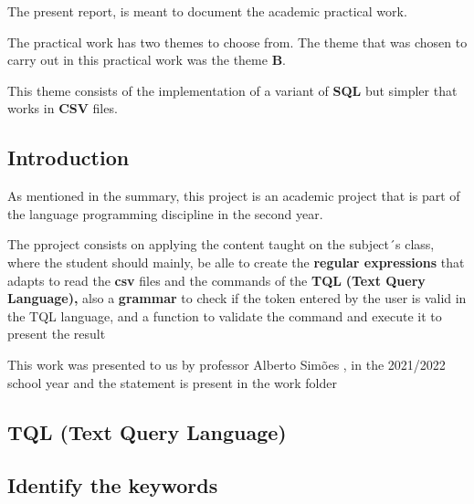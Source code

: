 \documentclass{article}
\begin{document}
    \setlength{\parindent}{10ex}
        The present report, is meant to document the academic practical work.  \par
    \noindent
        The practical work has two themes to choose from. The theme that was chosen to carry out in this practical work was the theme \textbf{B}.
        
        \setlength{\parindent}{10ex}
		This theme consists of the implementation of a variant of \textbf{SQL} but simpler that works in \textbf{CSV} files.


\clearpage

\tableofcontents

\clearpage

\Large
\begin{center}
\section{Introduction}
\end{center}

\setlength{\parindent}{10ex}
As mentioned in the summary, this project is an academic project that is part of the language programming discipline in the second year. \par


\setlength{\parindent}{10ex}
The pproject consists on applying the content taught on the subject´s class, where the student should mainly, be alle to create the \textbf{regular expressions} that adapts to read the \textbf{csv} files and the commands of the \textbf{TQL}\textbf{ (Text Query Language),} also a \textbf{grammar} to check if the token entered by the user is valid in the TQL language, and a function to validate the command and execute it to present the result

\setlength{\parindent}{10ex}
This work was presented to us by professor Alberto Simões , in the 2021/2022 school year and the statement is present in the work folder \par


\clearpage

\Large

\begin{center}
\section{TQL (Text Query Language)}
\end{center}

\subsection{Identify the keywords} 
\textbf{}
\end{document}
